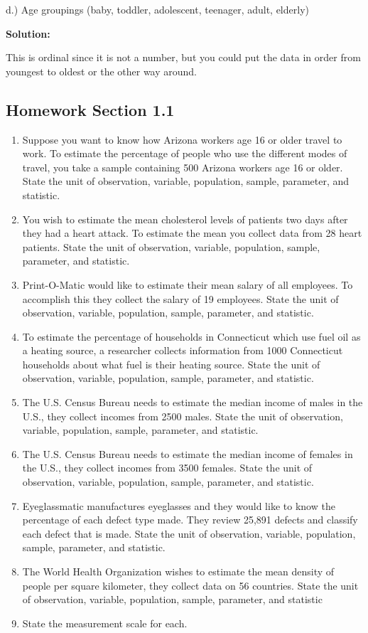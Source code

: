 \documentclass[
]{book}
\begin{document}
d.) Age groupings (baby, toddler, adolescent, teenager, adult, elderly)

\textbf{Solution:}

This is ordinal since it is not a number, but you could put the data in order from youngest to oldest or the other way around.

\hypertarget{homework-section-1.1}{%
\subsection{Homework Section 1.1}\label{homework-section-1.1}}

\begin{enumerate}
\def\labelenumi{\arabic{enumi}.}
\item
  Suppose you want to know how Arizona workers age 16 or older travel to work. To estimate the percentage of people who use the different modes of travel, you take a sample containing 500 Arizona workers age 16 or older. State the unit of observation, variable, population, sample, parameter, and statistic.
\item
  You wish to estimate the mean cholesterol levels of patients two days after they had a heart attack. To estimate the mean you collect data from 28 heart patients. State the unit of observation, variable, population, sample, parameter, and statistic.
\item
  Print-O-Matic would like to estimate their mean salary of all employees. To accomplish this they collect the salary of 19 employees. State the unit of observation, variable, population, sample, parameter, and statistic.
\item
  To estimate the percentage of households in Connecticut which use fuel oil as a heating source, a researcher collects information from 1000 Connecticut households about what fuel is their heating source. State the unit of observation, variable, population, sample, parameter, and statistic.
\item
  The U.S. Census Bureau needs to estimate the median income of males in the U.S., they collect incomes from 2500 males. State the unit of observation, variable, population, sample, parameter, and statistic.
\item
  The U.S. Census Bureau needs to estimate the median income of females in the U.S., they collect incomes from 3500 females. State the unit of observation, variable, population, sample, parameter, and statistic.
\item
  Eyeglassmatic manufactures eyeglasses and they would like to know the percentage of each defect type made. They review 25,891 defects and classify each defect that is made. State the unit of observation, variable, population, sample, parameter, and statistic.
\item
  The World Health Organization wishes to estimate the mean density of people per square kilometer, they collect data on 56 countries. State the unit of observation, variable, population, sample, parameter, and statistic
\item
  State the measurement scale for each.
\end{enumerate}
\end{document}
